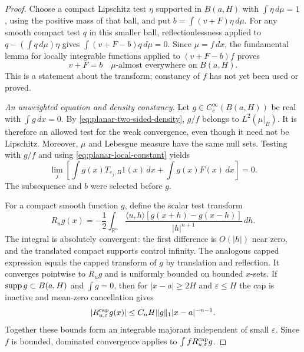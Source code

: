 \begin{proof}
Choose a compact Lipschitz test $\eta$ supported in $B(a,H)$ with
$\int\eta\,d\mu=1$, using the positive mass of that ball, and put
$b=\int(v+F)\eta\,d\mu$.  For any smooth compact test $q$ in this smaller
ball, reflectionlessness applied to
$q-(\int q\,d\mu)\eta$ gives
$\int(v+F-b)q\,d\mu=0$.
Since $\mu=f\,dx$, the fundamental lemma for locally integrable functions
applied to $(v+F-b)f$ proves
\begin{equation}\label{eq:planar-local-constant}
 v+F=b\quad\text{$\mu$-almost everywhere on }B(a,H).
\end{equation}
This is a statement about the transform; constancy of $f$ has not yet
been used or proved.

\emph{An unweighted equation and density constancy.}
Let $g\in C_c^\infty(B(a,H))$ be real with $\int g\,dx=0$.
By \eqref{eq:planar-two-sided-density}, $g/f$ belongs to
$L^2(\mu|_B)$.  It is therefore an allowed test for the weak convergence,
even though it need not be Lipschitz.  Moreover, $\mu$ and Lebesgue measure
have the same null sets.  Testing with $g/f$ and using
\eqref{eq:planar-local-constant} yields
\begin{equation}\label{eq:planar-unweighted-local}
 \lim_j\left[\int g(x)T_{\varepsilon_j,B}1(x)\,dx
                   +\int g(x)F(x)\,dx\right]=0.
\end{equation}
The subsequence and $b$ were selected before $g$.

For a compact smooth function $g$, define the scalar test transform
\[
 R_ug(x)=-\frac12\int_{\mathbb R^n}
 \frac{\langle u,h\rangle[g(x+h)-g(x-h)]}{|h|^{n+1}}\,dh.
\]
The integral is absolutely convergent: the first difference is
$O(|h|)$ near zero, and the translated compact supports control infinity.
The analogous capped expression equals the capped transform of $g$ by
translation and reflection.  It converges pointwise to $R_ug$ and is
uniformly bounded on bounded $x$-sets.  If $\operatorname{supp} g\subset B(a,H)$ and
$\int g=0$, then for $|x-a|\ge2H$ and $\varepsilon\le H$ the cap is
inactive and mean-zero cancellation gives
\[
 |R_{u,\varepsilon}^{\rm cap}g(x)|
 \le C_n H\|g\|_1|x-a|^{-n-1}.
\]
Together these bounds form an integrable majorant independent of small
$\varepsilon$.  Since $f$ is bounded, dominated convergence applies to
$\int f R_{u,\varepsilon}^{\rm cap}g$.


\end{proof}
